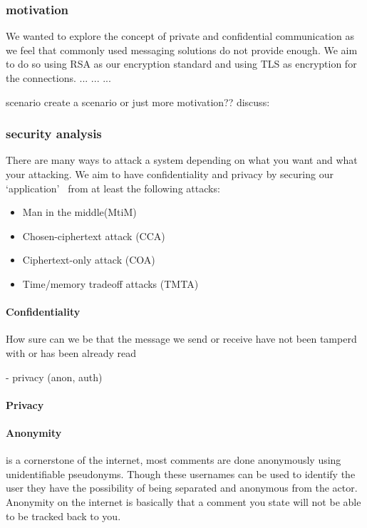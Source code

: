 
\subsubsection{motivation}
We wanted to explore the concept of private and
confidential communication as we feel that commonly used messaging
solutions do not provide enough. We aim to do so using RSA as our
encryption standard and using TLS as encryption for the connections.
...
...
...


scenario
create a scenario or just more motivation??
discuss:

\subsubsection{security analysis}
There are many ways to attack a system depending on what you want and
what your attacking. We aim to have confidentiality and privacy by
securing our `application'~ from at least the
following attacks:
\begin{itemize}
\item Man in the middle(MtiM)
\item Chosen-ciphertext attack (CCA)
\item Ciphertext-only attack (COA)
\item Time/memory tradeoff attacks (TMTA)
\end{itemize}

\paragraph{Confidentiality}
How sure can we be that the message we send or receive have not been tamperd with or has been already read

- privacy (anon, auth)

\paragraph{Privacy}
\paragraph{Anonymity}
is a cornerstone of the internet, most comments are done
anonymously using unidentifiable pseudonyms. Though these usernames
can be used to identify the user they have the possibility of being
separated and anonymous from the actor. Anonymity on the internet is
basically that a comment you state will not be able to be tracked back
to you.

